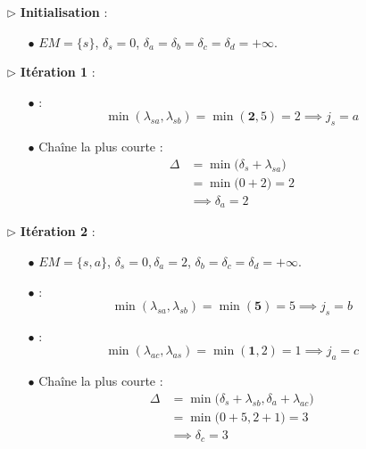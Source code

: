 \documentclass{report}
\begin{document}
\begin{multicols*}{2}
\begin{center}
\end{center}

\begin{itemize}
    \item[\( \rhd \)] \textbf{Initialisation} :
        \begin{itemize}
            \item[\( \bullet \)] \( EM = \{ s \} \), \( \delta_s = 0 \), \( \delta_a = \delta_b = \delta_c = \delta_d = +\infty \).
        \end{itemize}
    \item[\( \rhd \)] \textbf{Itération 1} :
        \begin{itemize}
            \item[\( \bullet \)]  :
                \[
                    \min(\lambda_{sa}, \lambda_{sb}) = 
                    \min(\boldsymbol{2}   , 5) = 2 \implies j_s = a
                \]
            \item[\( \bullet \)] Chaîne la plus courte :
                \begin{align*}
                    \Delta &= \min\bigl( \delta_s + \lambda_{sa} \bigr) \\
                      &= \min\bigl( 0 + 2 \bigr) = 2  \\
                      &\implies \delta_a = 2
                \end{align*}
        \end{itemize}
    \item[\( \rhd \)] \textbf{Itération 2} :
        \begin{itemize}
            \item[\( \bullet \)] \( EM = \{ s, a \} \), \( \delta_s = 0, \delta_a = 2\), \( \delta_b = \delta_c = \delta_d = +\infty \).
            \item[\( \bullet \)]  :
                \[
                    \min(\lambda_{sa}, \lambda_{sb}) = 
                    \min(\boldsymbol{5}  ) = 5 \implies j_s = b
                \]
            \item[\( \bullet \)]  :
                \[
                    \min(\lambda_{ac}, \lambda_{as}) =  
                    \min(\boldsymbol{1}, 2) = 1 \implies j_a = c
                \]
            \item[\( \bullet \)] Chaîne la plus courte :
                \begin{align*}
                    \Delta &= \min\bigl( \delta_s + \lambda_{sb}, \delta_a + \lambda_{ac} \bigr) \\
                           &= \min\bigl( 0 + 5, 2 + 1 \bigr) = 3  \\ 
                           &\implies \delta_c = 3 
                \end{align*}
        \end{itemize}


\end{itemize}
\end{multicols*}
\end{document}
